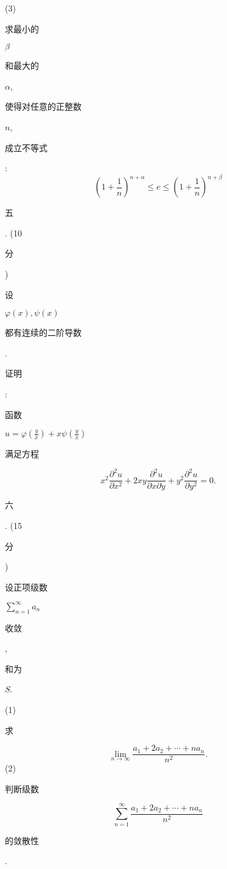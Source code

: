 \documentclass[10pt]{article}
\begin{document}
(3) \begin{CJK}{UTF8}{mj}求最小的\end{CJK} $\beta$ \begin{CJK}{UTF8}{mj}和最大的\end{CJK} $\alpha$, \begin{CJK}{UTF8}{mj}使得对任意的正整数\end{CJK} $n$, \begin{CJK}{UTF8}{mj}成立不等式\end{CJK}:
$$
\left(1+\frac{1}{n}\right)^{n+\alpha} \leqslant e \leqslant\left(1+\frac{1}{n}\right)^{n+\beta}
$$
\begin{CJK}{UTF8}{mj}五\end{CJK}. (10 \begin{CJK}{UTF8}{mj}分\end{CJK}) \begin{CJK}{UTF8}{mj}设\end{CJK} $\varphi(x), \psi(x)$ \begin{CJK}{UTF8}{mj}都有连续的二阶导数\end{CJK}. \begin{CJK}{UTF8}{mj}证明\end{CJK}: \begin{CJK}{UTF8}{mj}函数\end{CJK} $u=\varphi\left(\frac{y}{x}\right)+x \psi\left(\frac{y}{x}\right)$ \begin{CJK}{UTF8}{mj}满足方程\end{CJK}
$$
x^{2} \frac{\partial^{2} u}{\partial x^{2}}+2 x y \frac{\partial^{2} u}{\partial x \partial y}+y^{2} \frac{\partial^{2} u}{\partial y^{2}}=0 .
$$
\begin{CJK}{UTF8}{mj}六\end{CJK}. (15 \begin{CJK}{UTF8}{mj}分\end{CJK}) \begin{CJK}{UTF8}{mj}设正项级数\end{CJK} $\sum_{n=1}^{\infty} a_{n}$ \begin{CJK}{UTF8}{mj}收敛\end{CJK}, \begin{CJK}{UTF8}{mj}和为\end{CJK} $S$.

(1) \begin{CJK}{UTF8}{mj}求\end{CJK}
$$
\lim _{n \rightarrow \infty} \frac{a_{1}+2 a_{2}+\cdots+n a_{n}}{n^{2}} .
$$
(2) \begin{CJK}{UTF8}{mj}判断级数\end{CJK}
$$
\sum_{n=1}^{\infty} \frac{a_{1}+2 a_{2}+\cdots+n a_{n}}{n^{2}}
$$
\begin{CJK}{UTF8}{mj}的敛散性\end{CJK}.
\end{document}
